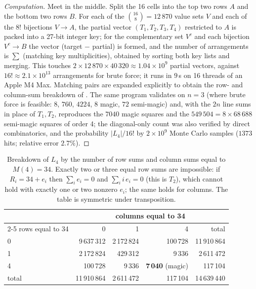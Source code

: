 \begin{proof}[Computation]
Meet in the middle.  Split the 16 cells into the top two rows $A$ and the bottom two rows $B$.
For each of the $\binom{16}{8}=12\,870$ value sets $V$ and each of the $8!$ bijections $V\to A$,
the partial vector $(T_1,T_2,T_3,T_4)$ restricted to $A$ is packed into a 27-bit integer key; for the
complementary set $V^{c}$ and each bijection $V^{c}\to B$ the vector (target $-$ partial) is
formed, and the number of arrangements is $\sum$ (matching key multiplicities), obtained by
sorting both key lists and merging.  This touches $2\times 12\,870\times 40\,320\approx 1.04\times10^{9}$
partial vectors, against $16!\approx 2.1\times10^{13}$ arrangements for brute force; it runs in
$9$\,s on 16 threads of an Apple M4 Max.  Matching pairs are expanded explicitly to obtain the
row- and column-sum breakdown of .  The same program validates on $n=3$
(where brute force is feasible: $8$, $760$, $4224$, $8$ magic, $72$ semi-magic) and, with the
$2n$ line sums in place of $T_1,T_2$, reproduces the $7040$ magic squares and the
$549\,504 = 8\times 68\,688$ semi-magic squares of order 4; the diagonal-only count was also
verified by direct combinatorics, and the probability $|L_4|/16!$ by $2\times10^{9}$ Monte Carlo
samples ($1373$ hits; relative error $2.7\%$).
\end{proof}

\begin{table}[t]
\centering
\caption{Breakdown of $L_4$ by the number of row sums and column sums equal to $M(4)=34$.
Exactly two or three equal row sums are impossible: if $R_i=34+e_i$ then $\sum_i e_i=0$ and
$\sum_i i\,e_i=0$ (this is $T_2$), which cannot hold with exactly one or two nonzero $e_i$;
the same holds for columns.  The table is symmetric under transposition.}
\label{tab:L4}
\begin{tabular}{lrrrr}
\toprule
 & \multicolumn{4}{c}{columns equal to 34} \\
\cmidrule(lr){2-5}
rows equal to 34 & 0 & 1 & 4 & total \\
\midrule
0 & 9\,637\,312 & 2\,172\,824 & 100\,728 & 11\,910\,864 \\
1 & 2\,172\,824 & 429\,312 & 9\,336 & 2\,611\,472 \\
4 & 100\,728 & 9\,336 & \textbf{7\,040} (magic) & 117\,104 \\
\midrule
total & 11\,910\,864 & 2\,611\,472 & 117\,104 & 14\,639\,440 \\
\bottomrule
\end{tabular}
\end{table}

